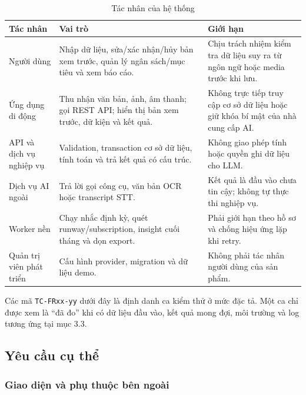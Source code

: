 \begin{table}[H]
  \centering
  \caption{Tác nhân của hệ thống}
  \label{tab:actors}
  \begin{tabularx}{\textwidth}{@{}L{3.4cm}Y Y@{}}
    \toprule
    \textbf{Tác nhân} & \textbf{Vai trò} & \textbf{Giới hạn} \\
    \midrule
    Người dùng & Nhập dữ liệu, sửa/xác nhận/hủy bản xem trước, quản lý ngân sách/mục tiêu và xem báo cáo. & Chịu trách nhiệm kiểm tra dữ liệu suy ra từ ngôn ngữ hoặc media trước khi lưu. \\
    Ứng dụng di động & Thu nhận văn bản, ảnh, âm thanh; gọi REST API; hiển thị bản xem trước, dữ kiện và kết quả. & Không trực tiếp truy cập cơ sở dữ liệu hoặc giữ khóa bí mật của nhà cung cấp AI. \\
    API và dịch vụ nghiệp vụ & Validation, transaction cơ sở dữ liệu, tính toán và trả kết quả có cấu trúc. & Không giao phép tính hoặc quyền ghi dữ liệu cho LLM. \\
    Dịch vụ AI ngoài & Trả lời gọi công cụ, văn bản OCR hoặc transcript STT. & Kết quả là đầu vào chưa tin cậy; không tự thực thi nghiệp vụ. \\
    Worker nền & Chạy nhắc định kỳ, quét runway/subscription, insight cuối tháng và dọn export. & Phải giới hạn theo hồ sơ và chống hiệu ứng lặp khi retry. \\
    Quản trị viên phát triển & Cấu hình provider, migration và dữ liệu demo. & Không phải tác nhân người dùng của sản phẩm. \\
    \bottomrule
  \end{tabularx}
\end{table}

Các mã \texttt{TC-FRxx-yy} dưới đây là định danh ca kiểm thử ở mức đặc tả. Một ca chỉ được xem là ``đã đo'' khi có dữ liệu đầu vào, kết quả mong đợi, môi trường và log tương ứng tại mục 3.3.

\subsection{Yêu cầu cụ thể}

\subsubsection{Giao diện và phụ thuộc bên ngoài}


